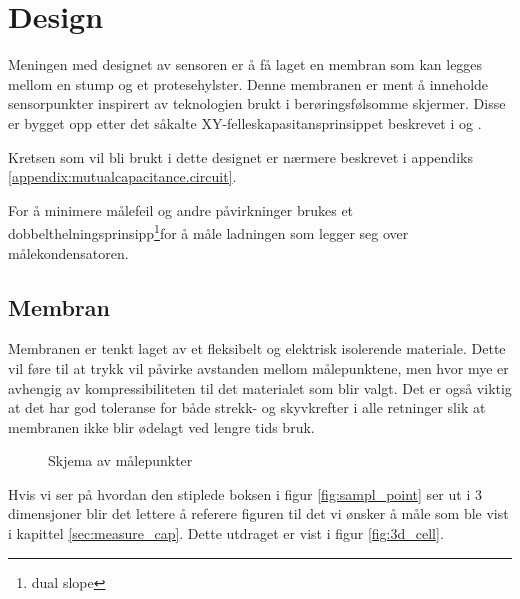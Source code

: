 
\section{Design}
Meningen med designet av sensoren er å få laget en membran som kan legges mellom en stump og et protesehylster. Denne membranen er ment å inneholde 
sensorpunkter inspirert av teknologien brukt i berøringsfølsomme skjermer. Disse er bygget opp etter det såkalte XY-felleskapasitansprinsippet beskrevet i \citet{qtan0079}
og \citet{quantum2006}.

Kretsen som vil bli brukt i dette designet er nærmere beskrevet i appendiks \vref{appendix:mutualcapacitance.circuit}.

For å minimere målefeil og andre påvirkninger brukes et dobbelthelningsprinsipp\footnote{dual slope}for å måle ladningen som legger seg over målekondensatoren.

\subsection{Membran}\label{sec:membran}
Membranen er tenkt laget av et fleksibelt og elektrisk isolerende materiale. Dette vil føre til at trykk vil påvirke avstanden mellom målepunktene, men hvor mye er avhengig av kompressibiliteten til det materialet som blir valgt. Det er også viktig at det har god toleranse for både strekk- og skyvkrefter i alle retninger slik at membranen ikke blir ødelagt
ved lengre tids bruk.

\begin{figure}[htbp]
\centering
{}
\caption{Skjema av målepunkter}
\label{fig:sampl_point}
\end{figure}

Hvis vi ser på hvordan den stiplede boksen i figur \vref{fig:sampl_point} ser ut i 3 dimensjoner blir det lettere å referere figuren til det vi ønsker å måle som 
ble vist i kapittel \vref{sec:measure_cap}. Dette utdraget er vist i figur \vref{fig:3d_cell}.

